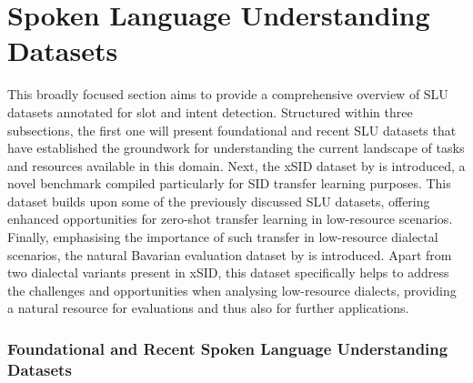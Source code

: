 \documentclass[11pt,a4paper,twoside,openright]{scrbook}
\begin{document}
\section{Spoken Language Understanding Datasets}

This broadly focused section aims to provide a comprehensive overview of SLU datasets annotated for slot and intent detection. Structured within three subsections, the first one will present foundational and recent SLU datasets that have established the groundwork for understanding the current landscape of tasks and resources available in this domain. Next, the xSID dataset by \citet{van-der-goot-etal-2021-masked} is introduced, a novel benchmark compiled particularly for SID transfer learning purposes. This dataset builds upon some of the previously discussed SLU datasets, offering enhanced opportunities for zero-shot transfer learning in low-resource scenarios. Finally, emphasising the importance of such transfer in low-resource dialectal scenarios, the natural Bavarian evaluation dataset by \citet{winkler-etal-2024-slot-intent} is introduced. Apart from two dialectal variants present in xSID, this dataset specifically helps to address the challenges and opportunities when analysing low-resource dialects, providing a natural resource for evaluations and thus also for further applications. 




\subsubsection{Foundational and Recent Spoken Language Understanding Datasets}
\end{document}

